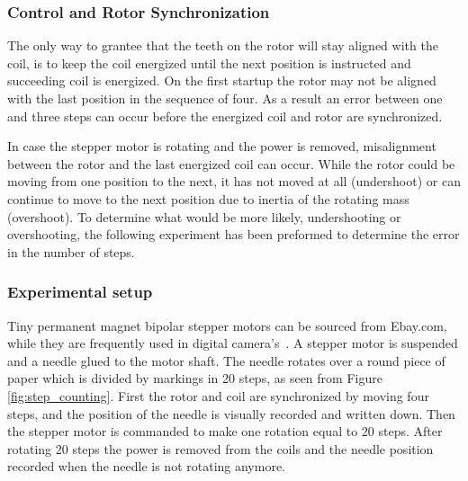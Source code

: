\subsubsection{Control and Rotor Synchronization}

The only way to grantee that the teeth on the rotor will stay aligned with the coil, is to keep the coil energized until the next position is instructed and succeeding coil is energized. 
On the first startup the rotor may not be aligned with the last position in the sequence of four.
As a result an error between one and three steps can occur before the energized coil and rotor are synchronized.

In case the stepper motor is rotating and the power is removed, misalignment between the rotor and the last energized coil can occur.
While the rotor could be moving from one position to the next, it has not moved at all (undershoot) or can continue to move to the next position due to inertia of the rotating mass (overshoot). 
To determine what would be more likely, undershooting or overshooting, the following experiment has been preformed to determine the error in the number of steps.

\subsubsection{Experimental setup}

Tiny permanent magnet bipolar stepper motors can be sourced from Ebay.com, while they are frequently used in digital camera's~\cite{nidec_stepper_2017}.
A stepper motor is suspended and a needle glued to the motor shaft.
The needle rotates over a round piece of paper which is divided by markings in 20 steps, as seen from Figure \ref{fig:step_counting}.
First the rotor and coil are synchronized by moving four steps, and the position of the needle is visually recorded and written down.  
Then the stepper motor is commanded to make one rotation equal to 20 steps.
After rotating 20 steps the power is removed from the coils and the needle position recorded when the needle is not rotating anymore.

